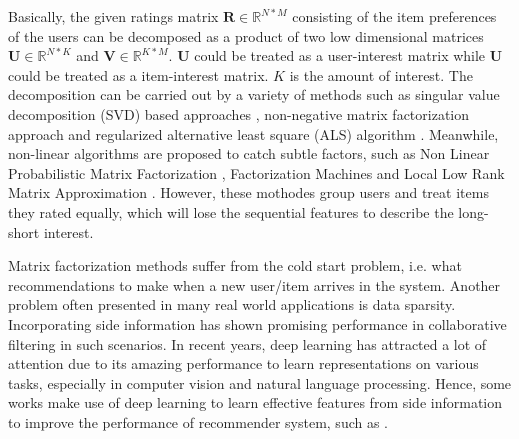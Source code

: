 \documentclass{sig-alternate-05-2015}
\begin{document}
Basically, the given ratings matrix $\mathbf{R} \in \mathbb{R}^{N*M}$
consisting of the item preferences of the users can be decomposed as
a product of two low dimensional matrices $\mathbf{U} \in \mathbb{R}^{N*K}$
and $\mathbf{V} \in \mathbb{R}^{K*M}$.
$\mathbf{U}$ could be treated as a user-interest matrix while
$\mathbf{U}$ could be treated as a item-interest matrix.
$K$ is the amount of interest.
The decomposition can be carried out by a variety of methods
such as singular value decomposition (SVD) based approaches \cite{mazumder2010spectral},
non-negative matrix factorization approach \cite{lee2001algorithms}
and regularized alternative least square (ALS) algorithm \cite{zhou2008large}.
Meanwhile, non-linear algorithms are proposed to catch subtle factors,
such as Non Linear Probabilistic Matrix Factorization \cite{lawrence2009non},
Factorization Machines \cite{rendle2010factorization} and
Local Low Rank Matrix Approximation \cite{lee2013local}.
However, these mothodes group users and treat items they rated equally,
which will lose the sequential features to describe the long-short interest.

Matrix factorization methods suffer from the cold start problem,
i.e. what recommendations to make when a new user/item arrives in the system.
Another problem often presented in many real world applications is data sparsity.
Incorporating side information has shown promising performance
in collaborative filtering in such scenarios.
In recent years, deep learning \cite{hinton2006reducing, hinton2006fast}
has attracted a lot of attention due to its amazing performance
to learn representations on various tasks,
especially in computer vision and natural language processing.
Hence, some works make use of deep learning to learn effective
features from side information to improve the performance of recommender system,
such as \cite{salakhutdinov2007restricted, van2013deep, wang2015collaborative, li2015deep}.
\end{document}

